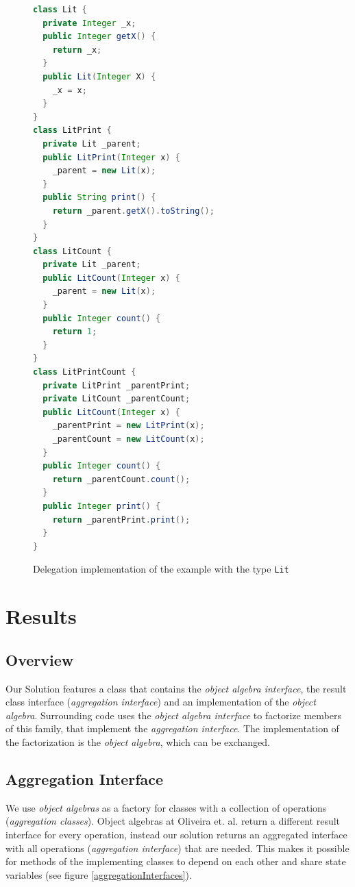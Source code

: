 \documentclass{report}
\begin{document}
\begin{figure}[H]
\begin{lstlisting}[language=java]
class Lit {
  private Integer _x;
  public Integer getX() {
    return _x;
  }
  public Lit(Integer X) {
    _x = x;
  }
}
class LitPrint {
  private Lit _parent;
  public LitPrint(Integer x) {
    _parent = new Lit(x);
  }
  public String print() {
    return _parent.getX().toString();
  }
}
class LitCount {
  private Lit _parent;
  public LitCount(Integer x) {
    _parent = new Lit(x);
  }
  public Integer count() {
    return 1;
  }
}
class LitPrintCount {
  private LitPrint _parentPrint;
  private LitCount _parentCount;
  public LitCount(Integer x) {
    _parentPrint = new LitPrint(x);
    _parentCount = new LitCount(x);
  }
  public Integer count() {
    return _parentCount.count();
  }
  public Integer print() {
    return _parentPrint.print();
  }
}
\end{lstlisting}
\caption{Delegation implementation of the example with the type \lstinline{Lit}}
\label{delegationExample}
\end{figure}


\section{Results}

\label{suggestedEPSolution}

\subsection{Overview}

Our Solution features a class that contains the \emph{object algebra interface}, the result class interface (\emph{aggregation interface}) and an implementation of the \emph{object algebra}. Surrounding code uses the \emph{object algebra interface} to factorize members of this family, that implement the \emph{aggregation interface}. The implementation of the factorization is the \emph{object algebra}, which can be exchanged.

\subsection{Aggregation Interface}

We use \emph{object algebras} as a factory for classes with a collection of operations (\emph{aggregation classes}). Object algebras at Oliveira et. al. return a different result interface for every operation, instead our solution returns an aggregated interface with all operations (\emph{aggregation interface}) that are needed. This makes it possible for methods of the implementing classes to depend on each other and share state variables (see figure \ref{aggregationInterfaces}).
\end{document}
